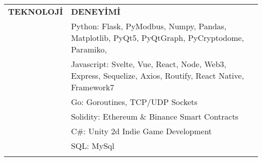 \begin{table}[ht!]
\begin{center}
\begin{tabular}{p{} p{}}
\footnotesize\textbf{TEKNOLOJİ} &\vspace{0.03cm}\hspace{-2.8cm}\footnotesize\textbf{DENEYİMİ} \\
\cmidrule[0.1mm]{1-2} 
\hspace{0.5cm}\raggedright \footnotesize \checkmark						& \hspace{-2cm}\footnotesize Python: \hspace{0.3cm} Flask, PyModbus, Numpy, Pandas, Matplotlib, PyQt5, PyQtGraph, PyCryptodome, Paramiko, \\
\hspace{0.5cm}\raggedright \footnotesize \checkmark						& \hspace{-2cm}\footnotesize Javascript: Svelte, Vue, React, Node, Web3, Express, Sequelize, Axios, Routify, React Native, Framework7\\
\hspace{0.5cm}\raggedright \footnotesize \checkmark						& \hspace{-2cm}\footnotesize  
Go: \hspace{1cm} Goroutines, TCP/UDP Sockets\\
\hspace{0.5cm}\raggedright \footnotesize \checkmark						& \hspace{-2cm}\footnotesize Solidity: \hspace{0.3cm} Ethereum \& Binance Smart Contracts\\
\hspace{0.5cm}\raggedright \footnotesize \checkmark						& \hspace{-2cm}\footnotesize
C\#: \hspace{0.94cm} Unity 2d Indie Game Development\\
\hspace{0.5cm}\raggedright \footnotesize \checkmark						& \hspace{-2cm}\footnotesize
SQL: \hspace{0.8cm} MySql\\
\cmidrule[0.1mm]{1-2}\vspace{0.1cm}				

\end{tabular}
\end{center}
\end{table}
